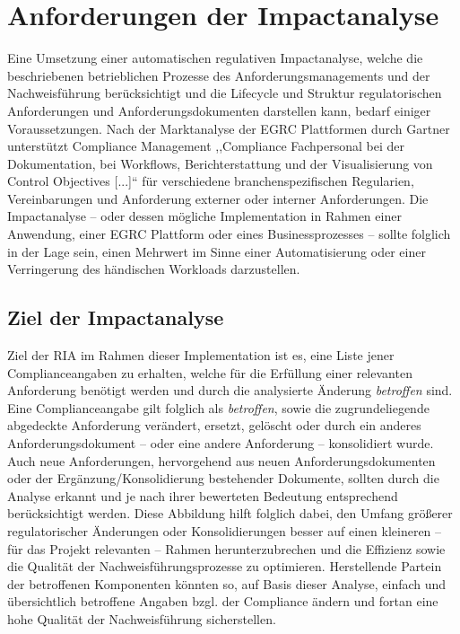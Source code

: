 \chapter{Anforderungen der Impactanalyse}

    Eine Umsetzung einer automatischen regulativen Impactanalyse, welche die beschriebenen betrieblichen Prozesse des Anforderungsmanagements und der Nachweisführung berücksichtigt und die Lifecycle und Struktur regulatorischen Anforderungen und Anforderungsdokumenten darstellen kann, bedarf einiger Voraussetzungen.  
    Nach der Marktanalyse der \ac{EGRC} Plattformen durch Gartner \cite{app_gartner} unterstützt Compliance Management ,,Compliance Fachpersonal bei der Dokumentation, bei Workflows, Berichterstattung und der Visualisierung von Control Objectives [...]``\cite[S.4 (übersetzt)]{app_gartner} für verschiedene branchenspezifischen Regularien, Vereinbarungen und Anforderung externer oder interner Anforderungen.       
    Die Impactanalyse -- oder dessen mögliche Implementation in Rahmen einer Anwendung, einer \ac{EGRC} Plattform oder eines Businessprozesses -- sollte folglich in der Lage sein, einen Mehrwert im Sinne einer Automatisierung oder einer Verringerung des händischen Workloads darzustellen.

\section{Ziel der Impactanalyse}
    
    Ziel der \acf{RIA} im Rahmen dieser Implementation ist es, eine Liste jener Complianceangaben zu erhalten, welche für die Erfüllung einer relevanten Anforderung benötigt werden und durch die analysierte Änderung \textit{betroffen} sind. 
    Eine Complianceangabe gilt folglich als \textit{betroffen}, sowie die zugrundeliegende abgedeckte Anforderung verändert, ersetzt, gelöscht oder durch ein anderes Anforderungsdokument -- oder eine andere Anforderung -- konsolidiert wurde.
    Auch neue Anforderungen, hervorgehend aus neuen Anforderungsdokumenten oder der Ergänzung/Konsolidierung bestehender Dokumente, sollten durch die Analyse erkannt und je nach ihrer bewerteten Bedeutung entsprechend berücksichtigt werden.   
    Diese Abbildung hilft folglich dabei, den Umfang größerer regulatorischer Änderungen oder Konsolidierungen besser auf einen kleineren -- für das Projekt relevanten -- Rahmen herunterzubrechen und die Effizienz sowie die Qualität der Nachweisführungsprozesse zu optimieren. 
    Herstellende Partein der betroffenen Komponenten könnten so, auf Basis dieser Analyse, einfach und übersichtlich betroffene Angaben bzgl. der Compliance ändern und fortan eine hohe Qualität der Nachweisführung sicherstellen.

